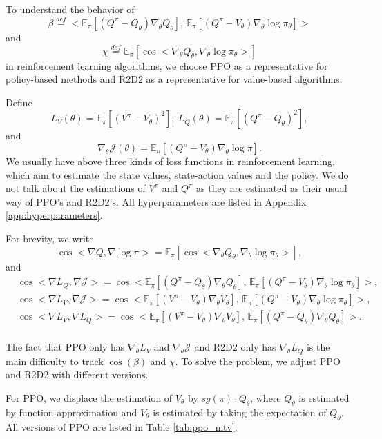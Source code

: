 To understand the behavior of 
{ $$
    \beta \overset{def}{=} <\mathbb{E}_\pi[(Q^\pi-Q_\theta)\nabla_\theta Q_\theta],\, \mathbb{E}_\pi[(Q^\pi-V_\theta) \nabla_\theta \log \pi_\theta]>
$$
}
and 
{ 
$$\chi \overset{def}{=} \mathbb{E}_\pi [\cos <\nabla_\theta Q_\theta, \nabla_\theta \log \pi_\theta>]$$
}
in reinforcement learning algorithms, we choose PPO as a representative for policy-based methods and R2D2 as a representative for value-based algorithms. 

Define $$L_V(\theta) = \mathbb{E}_\pi [ (V^{\pi} - V_\theta)^2 ],\  L_Q(\theta) = \mathbb{E}_\pi [ (Q^{\pi} - Q_\theta)^2 ],$$
and $$\nabla_\theta \mathcal{J}(\theta) = \mathbb{E}_\pi \left[ (Q^{\pi}  - V_\theta ) \nabla_\theta \log \pi \right].$$
We usually have above three kinds of loss functions in reinforcement learning, which aim to estimate the state values, state-action values and the policy. 
We do not talk about the estimations of $V^\pi$ and $Q^\pi$ as they are estimated as their usual way of PPO's and R2D2's. 
All hyperparameters are listed in Appendix \ref{app:hyperparameters}. 

{ For brevity, we write 
$$\cos<\nabla Q, \nabla \log \pi> = \mathbb{E}_\pi [\cos <\nabla_\theta Q_\theta, \nabla_\theta \log \pi_\theta>],$$
and
$$
\begin{aligned}
    &\cos<\nabla L_Q, \nabla \mathcal{J}> = \cos<\mathbb{E}_\pi[(Q^\pi-Q_\theta)\nabla_\theta Q_\theta],\, \mathbb{E}_\pi[(Q^\pi-V_\theta) \nabla_\theta \log \pi_\theta]>, \\
    &\cos<\nabla L_V, \nabla \mathcal{J}> = \cos<\mathbb{E}_\pi[(V^\pi-V_\theta)\nabla_\theta V_\theta],\, \mathbb{E}_\pi[(Q^\pi-V_\theta) \nabla_\theta \log \pi_\theta]>, \\
    &\cos<\nabla L_V, \nabla L_Q> = \cos<\mathbb{E}_\pi[(V^\pi-V_\theta)\nabla_\theta V_\theta],\, \mathbb{E}_\pi[(Q^\pi-Q_\theta) \nabla_\theta Q_\theta]>. \\
\end{aligned}
$$}

The fact that PPO only has $\nabla_\theta L_V$ and $\nabla_\theta \mathcal{J}$ and R2D2 only has $\nabla_\theta L_Q$ is the main difficulty to track $\cos(\beta)$ and $\chi$. 
To solve the problem, we adjust PPO and R2D2 with different versions.

For PPO, we displace the estimation of $V_\theta$ by $sg(\pi)\cdot Q_\theta$, where $Q_\theta$ is estimated by function approximation and $V_\theta$ is estimated by taking the expectation of $Q_\theta$.
All versions of PPO are listed in Table \ref{tab:ppo_mtv}.

